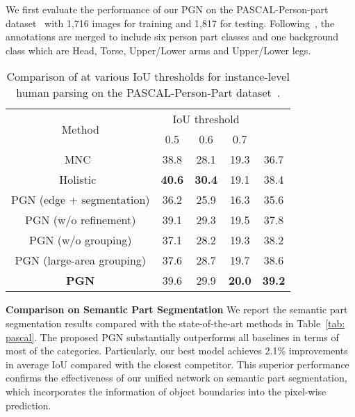 \documentclass[runningheads]{llncs}
\begin{document}
We first evaluate the performance of our PGN on the PASCAL-Person-part dataset~\cite{chen2014detect} with 1,716 images for training and 1,817 for testing. Following~\cite{chen2015attention,xia2015zoom}, the annotations are merged to include six person part classes and one background class which are Head, Torse, Upper/Lower arms and Upper/Lower legs. 



\begin{table}[t]
\centering
\small
\caption{Comparison of  at various IoU thresholds for instance-level human parsing on the PASCAL-Person-Part dataset~\cite{chen2014detect}.}
\tabcolsep 0.15in 
\begin{tabular}{ccccc}
\toprule[0.7pt]
\multirow{2}{*}{Method}        & \multicolumn{3}{c}{IoU threshold}   &  \multirow{2}{*}{}   \\     
                               & 0.5           & 0.6           &  0.7          &                  \\ \hline
MNC~\cite{Dai_2016_CVPR}       & 38.8          & 28.1          & 19.3          & 36.7             \\
Holistic~\cite{li2017holistic} & \textbf{40.6} & \textbf{30.4} & 19.1          & 38.4             \\  \hline
PGN (edge + segmentation)      & 36.2          & 25.9          & 16.3          & 35.6             \\
PGN (w/o refinement)           & 39.1          & 29.3          & 19.5          & 37.8             \\  
PGN (w/o grouping)             & 37.1          & 28.2          & 19.3          & 38.2             \\
PGN (large-area grouping)      & 37.6          & 28.7          & 19.7          & 38.6             \\     \hline
\textbf{PGN}                   & 39.6          & 29.9          & \textbf{20.0} & \textbf{39.2}    \\
\toprule[0.7pt]
\end{tabular}
\vspace{-8mm}
\label{tab: instance_pascal}
\end{table}


\textbf{Comparison on Semantic Part Segmentation} 
We report the semantic part segmentation results compared with the state-of-the-art methods in Table~\ref{tab: pascal}. The proposed PGN substantially outperforms all baselines in terms of most of the categories. Particularly, our best model achieves 2.1\% improvements in average IoU compared with the closest competitor. This superior performance confirms the effectiveness of our unified network on semantic part segmentation, which incorporates the information of object boundaries into the pixel-wise prediction.
\end{document}
